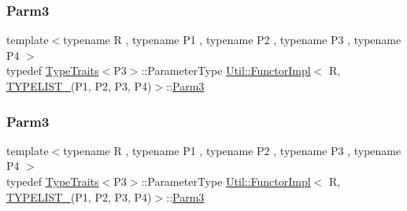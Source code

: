 \subsubsection{\texorpdfstring{Parm3}{Parm3}\hspace{0.1cm}{\footnotesize\ttfamily [1/2]}}
{\footnotesize\ttfamily template$<$typename R , typename P1 , typename P2 , typename P3 , typename P4 $>$ \\
typedef \mbox{\hyperlink{classUtil_1_1TypeTraits}{Type\+Traits}}$<$P3$>$\+::Parameter\+Type \mbox{\hyperlink{classUtil_1_1FunctorImpl}{Util\+::\+Functor\+Impl}}$<$ R, \mbox{\hyperlink{install_2include_2adat_2typelist_8h_a7a156c571ab21a16b0495e1c882a07fa}{T\+Y\+P\+E\+L\+I\+S\+T\+\_}}(P1, P2, P3, P4)$>$\+::\mbox{\hyperlink{structUtil_1_1Private_1_1FunctorImplBase_a052148e627fd4caecbcffdbdf1033dbb}{Parm3}}}

\mbox{\label{classUtil_1_1FunctorImpl_3_01R_00_01TYPELIST__4_07P1_00_01P2_00_01P3_00_01P4_08_4_a50b605c92c54da7770a000867a97287a}} 
\subsubsection{\texorpdfstring{Parm3}{Parm3}\hspace{0.1cm}{\footnotesize\ttfamily [2/2]}}
{\footnotesize\ttfamily template$<$typename R , typename P1 , typename P2 , typename P3 , typename P4 $>$ \\
typedef \mbox{\hyperlink{classUtil_1_1TypeTraits}{Type\+Traits}}$<$P3$>$\+::Parameter\+Type \mbox{\hyperlink{classUtil_1_1FunctorImpl}{Util\+::\+Functor\+Impl}}$<$ R, \mbox{\hyperlink{install_2include_2adat_2typelist_8h_a7a156c571ab21a16b0495e1c882a07fa}{T\+Y\+P\+E\+L\+I\+S\+T\+\_}}(P1, P2, P3, P4)$>$\+::\mbox{\hyperlink{structUtil_1_1Private_1_1FunctorImplBase_a052148e627fd4caecbcffdbdf1033dbb}{Parm3}}}

\mbox{\label{classUtil_1_1FunctorImpl_3_01R_00_01TYPELIST__4_07P1_00_01P2_00_01P3_00_01P4_08_4_a7375a2710126cb146191bd1c17af2f1d}} 
